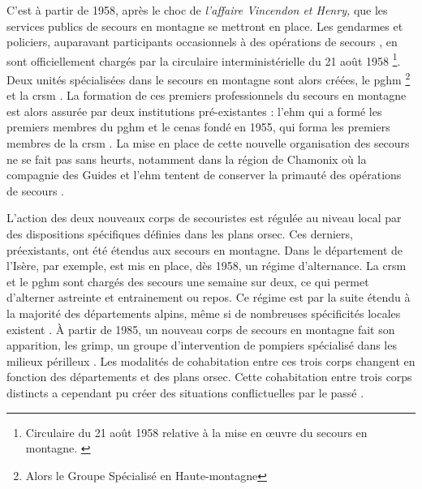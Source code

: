 C'est à partir de 1958, après le choc de \emph{l'affaire Vincendon et
  Henry,} que les services publics de secours en montagne se mettront
en place. Les gendarmes et policiers, auparavant participants
occasionnels à des opérations de secours
\autocite{Mollaret2016,CFDLD}, en sont officiellement chargés par la
circulaire interministérielle du 21 août 1958 \footnote{Circulaire  du 21 août 1958 relative à la mise en œuvre du secours en
  montagne. \label{fn:circulaire_21_aout_58}}. Deux unités
spécialisées dans le secours en montagne sont alors créées, le
\ac{pghm} \footnote{Alors le Groupe Spécialisé en Haute-montagne} et
la \ac{crsm} \autocite{Halle2007}. La formation de ces premiers
professionnels du secours en montagne est alors assurée par deux
institutions pré-existantes : l'\ac{ehm} qui a formé les premiers
membres du \ac{pghm} et le \ac{cenas} fondé en 1955, qui forma les
premiers membres de la \ac{crsm} \autocite{Mezin2016}. La mise en
place de cette nouvelle organisation des secours ne se fait pas sans
heurts, notamment dans la région de Chamonix où la compagnie des
Guides et l'\ac{ehm} tentent de conserver la primauté des opérations
de secours \autocite{Chandellier2016}.

L'action des deux nouveaux corps de secouristes est régulée au niveau
local par des dispositions spécifiques définies dans les plans
\ac{orsec}. Ces derniers, préexistants, ont été étendus aux secours en
montagne. Dans le département de l'Isère, par exemple, est mis en
place, dès 1958, un régime d'alternance. La \ac{crsm} et le \ac{pghm}
sont chargés des secours une semaine sur deux, ce qui permet
d'alterner astreinte et entrainement ou repos. Ce régime est par la
suite étendu à la majorité des départements alpins, même si de
nombreuses spécificités locales existent \autocite{Halle2007}. À
partir de 1985, un nouveau corps de secours en montagne fait son
apparition, les \ac{grimp}, un groupe d'intervention de pompiers
spécialisé dans les milieux périlleux \autocite{CFDLD}. Les modalités
de cohabitation entre ces trois corps changent en fonction des
départements et des plans \ac{orsec}. Cette cohabitation entre trois
corps distincts a cependant pu créer des situations conflictuelles par
le passé \autocite{Soule2002, Ganser2012}.


